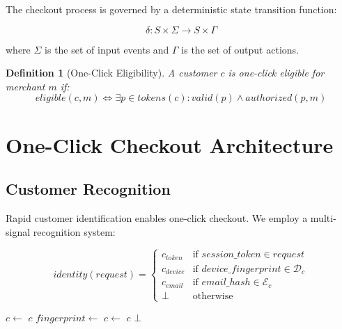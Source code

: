 \documentclass[11pt,a4paper]{article}
\newtheorem{definition}[theorem]{Definition}
\begin{document}
The checkout process is governed by a deterministic state transition function:

\begin{equation}
\delta: S \times \Sigma \rightarrow S \times \Gamma
\end{equation}

where $\Sigma$ is the set of input events and $\Gamma$ is the set of output actions.

\begin{definition}[One-Click Eligibility]
A customer $c$ is one-click eligible for merchant $m$ if:
\begin{equation}
eligible(c, m) \iff \exists p \in tokens(c) : valid(p) \land authorized(p, m)
\end{equation}
\end{definition}

\section{One-Click Checkout Architecture}

\subsection{Customer Recognition}

Rapid customer identification enables one-click checkout. We employ a multi-signal recognition system:

\begin{equation}
identity(request) = \begin{cases}
    c_{token} & \text{if } session\_token \in request \\
    c_{device} & \text{if } device\_fingerprint \in \mathcal{D}_c \\
    c_{email} & \text{if } email\_hash \in \mathcal{E}_c \\
    \bot & \text{otherwise}
\end{cases}
\end{equation}

\begin{algorithm}
\caption{Customer Recognition}
\begin{algorithmic}[1]
        \State $c \gets$ 
         \Return $c$ \EndIf
    \EndIf
    \State $fingerprint \gets$ 
    \State $c \gets$ 
        \State \Return $c$
    \EndIf
        \State \Return {}
    \EndIf
    \State \Return $\bot$
\EndFunction
\end{algorithmic}
\end{algorithm}
\end{document}
